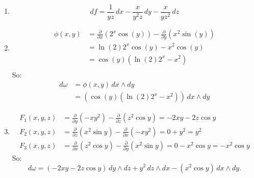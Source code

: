 \begin{solution}
	\begin{enumerate}
		\item
		      $$
			      df = \frac{1}{yz} \, dx - \frac{x}{y^2z} \, dy - \frac{x}{yz^2} \, dz
		      $$
		\item
		      $$
			      \begin{aligned}
				      \phi(x, y) & = \frac{\partial}{\partial x}(2^x \cos(y)) - \frac{\partial}{\partial y}(x^2 \sin(y)) \\
				                 & = \ln(2) 2^x \cos(y) - x^2 \cos(y)                                                    \\
				                 & = \cos(y) \left( \ln(2) 2^x - x^2 \right)                                             \\
			      \end{aligned}
		      $$
		      So:
		      $$
			      \begin{aligned}
				      d\omega & = \phi(x,y) \, dx \wedge dy                                              \\
				              & = \left( \cos(y) \left( \ln(2) 2^x - x^2 \right) \right) \, dx \wedge dy
			      \end{aligned}
		      $$
		\item
		      $$
			      \begin{aligned}
				      F_1(x,y,z) & = \frac{\partial}{\partial y}(-xy^2) - \frac{\partial}{\partial z}(z^2 \cos y) = -2xy - 2z \cos y                  \\
				      F_2(x,y,z) & = \frac{\partial}{\partial z}(x^2 \sin y) - \frac{\partial}{\partial x}(-xy^2) = 0 + y^2 = y^2                     \\
				      F_3(x,y,z) & = \frac{\partial}{\partial x}(z^2 \cos y) - \frac{\partial}{\partial y}(x^2 \sin y) = 0 - x^2 \cos y = -x^2 \cos y
			      \end{aligned}
		      $$
		      So:
		      $$
			      d\omega = (-2xy - 2z \cos y) \, dy \wedge dz + y^2 \, dz \wedge dx - (x^2 \cos y) \, dx \wedge dy.
		      $$
	\end{enumerate}
\end{solution}

